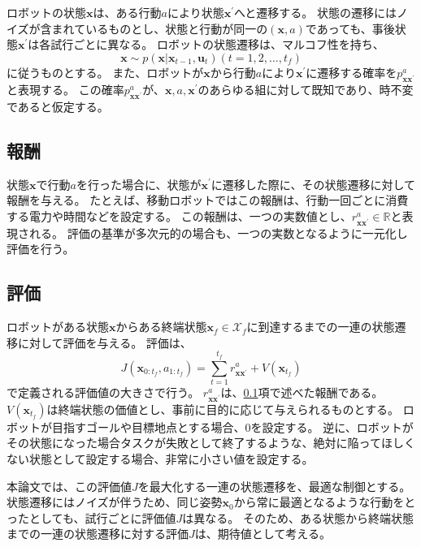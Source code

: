 ロボットの状態$\bm{x}$は、ある行動$a$により状態$\bm{x}^{\prime}$へと遷移する。
状態の遷移にはノイズが含まれているものとし、状態と行動が同一の$(\bm{x}, a)$であっても、事後状態$\bm{x}^{\prime}$は各試行ごとに異なる。
ロボットの状態遷移は、マルコフ性を持ち、
\begin{equation}
\label{trans prob}
  \bm{x} \sim p(\bm{x} | \bm{x}_{t-1}, \bm{u}_t) (t=1,2,\ldots,t_{f})
\end{equation}
に従うものとする。
また、ロボットが$\bm{x}$から行動$a$により$\bm{x}^{\prime}$に遷移する確率を$p^{a}_{\bm{x}\bm{x}^{\prime}}$と表現する。
この確率$p^{a}_{\bm{x}\bm{x}^{\prime}}$が、$\bm{x}, a, \bm{x}^{\prime}$のあらゆる組に対して既知であり、時不変であると仮定する。

\subsection{報酬} \label{subsection:reward}
状態$\bm{x}$で行動$a$を行った場合に、状態が$\bm{x}^{\prime}$に遷移した際に、その状態遷移に対して報酬を与える。
たとえば、移動ロボットではこの報酬は、行動一回ごとに消費する電力や時間などを設定する。
この報酬は、一つの実数値とし、$r^{a}_{\bm{x}\bm{x}^{\prime}} \in \mathbb{R}$と表現される。
評価の基準が多次元的の場合も、一つの実数となるように一元化し評価を行う。

\subsection{評価}
ロボットがある状態$\bm{x}$からある終端状態$\bm{x}_{f} \in \mathcal{X}_{f}$に到達するまでの一連の状態遷移に対して評価を与える。
評価は、
\begin{equation}
\label{evaluation}
  J( \bm{x}_{0:t_{f}}, a_{1:t_{f}} ) = \sum^{t_{f}}_{t=1} r^{a}_{\bm{x}\bm{x}^{\prime}} + V(\bm{x}_{t_{f}})
\end{equation}
で定義される評価値の大きさで行う。
$r^{a}_{\bm{x}\bm{x}^{\prime}}$は、\ref{subsection:reward}項で述べた報酬である。
$V(\bm{x}_{t_{f}})$は終端状態の価値とし、事前に目的に応じて与えられるものとする。
ロボットが目指すゴールや目標地点とする場合、$0$を設定する。
逆に、ロボットがその状態になった場合タスクが失敗として終了するような、絶対に陥ってほしくない状態として設定する場合、非常に小さい値を設定する。

本論文では、この評価値$J$を最大化する一連の状態遷移を、最適な制御とする。
状態遷移にはノイズが伴うため、同じ姿勢$\bm{x}_{0}$から常に最適となるような行動をとったとしても、試行ごとに評価値$J$は異なる。
そのため、ある状態から終端状態までの一連の状態遷移に対する評価$J$は、期待値として考える。

